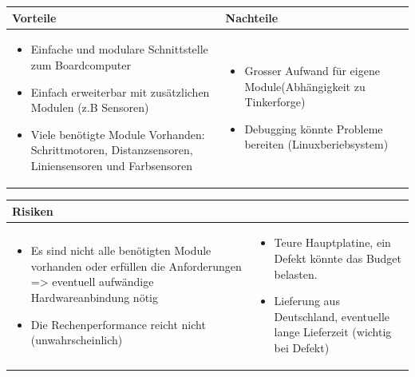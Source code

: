\begin{table}[h]
\begin{tabular}{p{} | p{}}


\textbf{Vorteile} & \textbf{Nachteile} \\ \hline
	 
\begin{itemize}
\item Einfache und modulare Schnittstelle zum Boardcomputer
\item Einfach erweiterbar mit zusätzlichen Modulen (z.B Sensoren)
\item Viele benötigte Module Vorhanden: Schrittmotoren, Distanzsensoren, Liniensensoren und Farbsensoren
\end{itemize}
 &
\begin{itemize}
\item Grosser Aufwand für eigene Module(Abhängigkeit zu Tinkerforge)
\item Debugging könnte Probleme bereiten (Linuxberiebsystem) 
\end{itemize}
\end{tabular}
\end{table}


\begin{table}[h]
\begin{tabular}{p{}p{}}


\textbf{Risiken} & \\ \hline
	 
\begin{itemize}
\item Es sind nicht alle benötigten Module vorhanden oder erfüllen die Anforderungen => eventuell aufwändige Hardwareanbindung nötig
\item Die Rechenperformance reicht nicht (unwahrscheinlich)
\end{itemize}
&
\begin{itemize}
\item Teure Hauptplatine, ein Defekt könnte das Budget belasten.
\item Lieferung aus Deutschland, eventuelle lange Lieferzeit (wichtig bei Defekt)
\end{itemize}

 
\end{tabular}
\end{table}

\pagebreak
